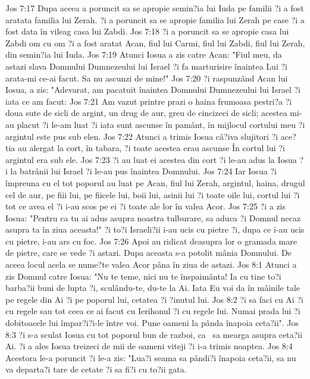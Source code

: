 Jos 7:17  Dupa aceea a poruncit sa se apropie semin?ia lui Iuda pe familii ?i a fost aratata familia lui Zerah. ?i a poruncit sa se apropie familia lui Zerah pe case ?i a fost data în vileag casa lui Zabdi.
Jos 7:18  ?i a poruncit sa se apropie casa lui Zabdi om cu om ?i a fost aratat Acan, fiul lui Carmi, fiul lui Zabdi, fiul lui Zerah, din semin?ia lui Iuda.
Jos 7:19  Atunci Iosua a zis catre Acan: "Fiul meu, da astazi slava Domnului Dumnezeului lui Israel ?i fa marturisire înaintea Lui ?i arata-mi ce-ai facut. Sa nu ascunzi de mine!"
Jos 7:20  ?i raspunzând Acan lui Iosua, a zis: "Adevarat, am pacatuit înaintea Domnului Dumnezeului lui Israel ?i iata ce am facut:
Jos 7:21  Am vazut printre prazi o haina frumoasa pestri?a ?i doua sute de sicli de argint, un drug de aur, greu de cincizeci de sicli; acestea mi-au placut ?i le-am luat ?i iata sunt ascunse în pamânt, în mijlocul cortului meu ?i argintul este pus sub elen.
Jos 7:22  Atunci a trimis Iosua câ?iva slujitori ?i ace?tia au alergat la cort, în tabara, ?i toate acestea erau ascunse În cortul lui ?i argintul era sub ele.
Jos 7:23  ?i au luat ei acestea din cort ?i le-au adus la Iosua ?i la batrânii lui Israel ?i le-au pus înaintea Domnului.
Jos 7:24  Iar Iosua ?i împreuna cu el tot poporul au luat pe Acan, fiul lui Zerah, argintul, haina, drugul cel de aur, pe fiii lui, pe fiicele lui, boii lui, asinii lui ?i toate oile lui, cortul lui ?i tot ce avea el ?i i-au scos pe ei ?i toate ale lor în valea Acor.
Jos 7:25  ?i a zis Iosua: "Pentru ca tu ai adus asupra noastra tulburare, sa aduca ?i Domnul necaz asupra ta în ziua aceasta!" ?i to?i Israeli?ii i-au ucis cu pietre ?i, dupa ce i-au ucis cu pietre, i-au ars cu foc.
Jos 7:26  Apoi au ridicat deasupra lor o gramada mare de pietre, care se vede ?i astazi. Dupa aceasta s-a potolit mânia Domnului. De aceea locul acela se nume?te valea Acor pâna în ziua de astazi.
Jos 8:1  Atunci a zis Domnul catre Iosua: "Nu te teme, nici nu te înspaimânta! Ia cu tine to?i barba?ii buni de lupta ?i, sculându-te, du-te la Ai. Iata Eu voi da în mâinile tale pe regele din Ai ?i pe poporul lui, cetatea ?i ?inutul lui.
Jos 8:2  ?i sa faci cu Ai ?i cu regele sau tot ceea ce ai facut cu Ierihonul ?i cu regele lui. Numai prada lui ?i dobitoacele lui împar?i?i-le între voi. Pune oameni la pânda înapoia ceta?ii".
Jos 8:3  ?i s-a sculat Iosua cu tot poporul bun de razboi, ca  sa mearga asupra ceta?ii Ai. ?i a ales Iosua treizeci de mii de oameni viteji ?i i-a trimis noaptea.
Jos 8:4  Acestora le-a poruncit ?i le-a zis: "Lua?i seama sa pândi?i înapoia ceta?ii, sa nu va departa?i tare de cetate ?i sa fi?i cu to?ii gata.
